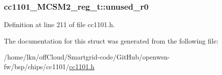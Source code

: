 \subsubsection[{\texorpdfstring{unused\+\_\+r0}{unused_r0}}]{ cc1101\+\_\+\+M\+C\+S\+M2\+\_\+reg\+\_\+t\+::unused\+\_\+r0}\hypertarget{structcc1101___m_c_s_m2__reg__t_a1a7698d9696f9cf2d45b6d4246d74034}{}\label{structcc1101___m_c_s_m2__reg__t_a1a7698d9696f9cf2d45b6d4246d74034}


Definition at line 211 of file cc1101.\+h.



The documentation for this struct was generated from the following file\+:\begin{DoxyCompactItemize}
\item 
/home/lkn/off\+Cloud/\+Smartgrid-\/code/\+Git\+Hub/openwsn-\/fw/bsp/chips/cc1101/\hyperlink{cc1101_8h}{cc1101.\+h}\end{DoxyCompactItemize}
